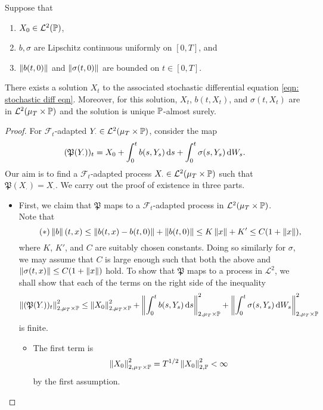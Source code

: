\begin{ftheo}
	Suppose that
	\begin{enumerate}
		\item $X_0 \in \mathcal{L}^2(\mathbb{P})$,
		\item $b,\sigma$ are Lipschitz continuous uniformly on $[0,T]$, and
		\item $\left\lVert b(t,0)\right\rVert$ and $\left\lVert\sigma(t,0)\right\rVert$ are bounded on $t\in[0,T]$.
	\end{enumerate}
	There exists a solution $X_t$ to the associated stochastic differential equation \eqref{eqn: stochastic diff eqn}. Moreover, for this solution, $X_t$, $b(t,X_t)$, and $\sigma(t,X_t)$ are in $\mathcal{L}^2(\mu_T\times\mathbb{P})$ and the solution is unique $\mathbb{P}$-almost surely.
\end{ftheo}
\begin{proof}
	For $\mathcal{F}_t$-adapted $Y_\cdot\in\mathcal{L}^2(\mu_T\times\mathbb{P})$, consider the map
	\[ (\mathfrak{P}(Y_\cdot))_t = X_0 + \int_0^t b(s,Y_s)\operatorname{d}\!{s} + \int_0^t \sigma(s,Y_s)\operatorname{d}\!{W}_s. \]
	Our aim is to find a $\mathcal{F}_t$-adapted process $X_\cdot\in\mathcal{L}^2(\mu_T\times\mathbb{P})$ such that $\mathfrak{P}(X_\cdot) = X_\cdot$. We carry out the proof of existence in three parts.
	\begin{itemize}
		\item First, we claim that $\mathfrak{P}$ maps to a $\mathcal{F}_t$-adapted process in $\mathcal{L}^2(\mu_T\times\mathbb{P})$.\\
			Note that
			\begin{equation*}
				\tag{$*$}
				\label{eqn: picard iteration bounded growth}
				\left\lVert b\right\rVert(t,x) \leq \left\lVert b(t,x)-b(t,0)\right\rVert + \left\lVert b(t,0)\right\rVert \leq K\left\lVert x\right\rVert + K' \leq C(1+\left\lVert x\right\rVert),
			\end{equation*}
			where $K$, $K'$, and $C$ are suitably chosen constants. Doing so similarly for $\sigma$, we may assume that $C$ is large enough such that both the above and $\left\lVert\sigma(t,x)\right\rVert \leq C(1+\left\lVert x\right\rVert)$ hold. To show that $\mathfrak{P}$ maps to a process in $\mathcal{L}^2$, we shall show that each of the terms on the right side of the inequality
			\[ \left\lVert(\mathfrak{P}(Y_\cdot))_t\right\rVert^2_{2,\mu_T\times\mathbb{P}} \leq \left\lVert X_0\right\rVert^2_{2,\mu_T\times\mathbb{P}} + \left\lVert\int_0^t b(s,Y_s)\operatorname{d}\!{s}\right\rVert^2_{2,\mu_T\times\mathbb{P}} + \left\lVert\int_0^t \sigma(s,Y_s)\operatorname{d}\!{W}_s\right\rVert^2_{2,\mu_T\times\mathbb{P}} \]
			is finite.
			\begin{itemize}
				\item The first term is
				\[ \left\lVert X_0\right\rVert^2_{2,\mu_T\times\mathbb{P}} = T^{1/2} \left\lVert X_0\right\rVert^2_{2,\mathbb{P}} < \infty \]
				by the first assumption.

\end{itemize}
\end{itemize}
\end{proof}
